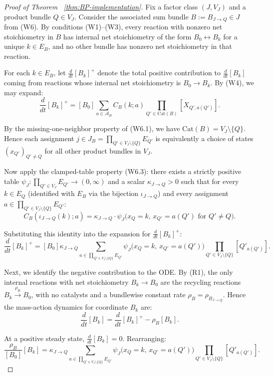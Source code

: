 \documentclass{article}
\theoremstyle{plain}
\theoremstyle{definition}
\theoremstyle{remark}
\newcommand{\Cat}{\textrm{Cat}}
\newcommand{\<}{\langle}
\renewcommand{\>}{\rangle}
\begin{document}
\begin{proof}[Proof of Theorem ~\ref{thm:BP-implementation}]
Fix a factor class $(J, V_J)$ and a product bundle $Q \in V_J$. Consider the 
associated sum bundle $B := B_{J \to Q} \in J$ from (W6). By conditions (W1)--(W3), 
every reaction with nonzero net stoichiometry in $B$ has internal net stoichiometry 
of the form $B_0 \leftrightarrow B_k$ for a unique $k \in E_B$, and no other bundle 
has nonzero net stoichiometry in that reaction.

For each $k \in E_B$, let $\frac{d}{dt}[B_k]^+$ denote the total positive contribution 
to $\frac{d}{dt}[B_k]$ coming from reactions whose internal net stoichiometry is 
$B_0 \to B_k$. By (W4), we may expand:
\[
\frac{d}{dt}[B_k]^+ = [B_0] \sum_{a \in \mathcal A_B} C_B(k; a) \prod_{Q' \in \Cat(B)} [X_{Q', a(Q')}].
\]

By the missing-one-neighbor property of (W6.1), we have $\Cat(B) = V_J \setminus \{Q\}$. 
Hence each assignment $j \in J_B = \prod_{Q' \in V_J \setminus \{Q\}} E_{Q'}$ is equivalently 
a choice of states $(x_{Q'})_{Q' \neq Q}$ for all other product bundles in $V_J$.

Now apply the clamped-table property (W6.3): there exists a strictly positive table 
$\psi_J : \prod_{Q' \in V_J} E_{Q'} \to (0, \infty)$ and a scalar $\kappa_{J \to Q} > 0$ 
such that for every $k \in E_Q$ (identified with $E_B$ via the bijection $\iota_{J \to Q}$) 
and every assignment $a \in \prod_{Q' \in V_J\setminus\{Q\}} E_{Q'}$:
\[
C_B(\iota_{J \to Q}(k); a) = \kappa_{J \to Q} \cdot \psi_J\bigl(x_Q = k,\, x_{Q'} = a(Q') \text{ for } Q' \neq Q\bigr).
\]

Substituting this identity into the expansion for $\frac{d}{dt}[B_k]^+$:
\[
\frac{d}{dt}[B_k]^+ = [B_0] \kappa_{J \to Q} \sum_{a \in \prod_{Q' \in V_J\setminus\{Q\}} E_{Q'}} 
\psi_J\bigl(x_Q = k,\, x_{Q'} = a(Q')\bigr) \prod_{Q' \in V_J\setminus\{Q\}} [Q'_{a(Q')}].
\]

Next, we identify the negative contribution to the ODE. By (R1), the only internal reactions 
with net stoichiometry $B_k \to B_0$ are the recycling reactions 
$B_k \xrightarrow{\rho_B} B_0$, with no catalysts and a bundlewise constant rate 
$\rho_B = \rho_{B_{J \to Q}}$. Hence the mass-action dynamics for coordinate $B_k$ are:
\[
\frac{d}{dt}[B_k] = \frac{d}{dt}[B_k]^+ - \rho_B [B_k].
\]

At a positive steady state, $\frac{d}{dt}[B_k] = 0$. Rearranging:
\begin{equation}\label{eq:sum-derived}
\frac{\rho_B}{[B_0]}[B_k] = \kappa_{J \to Q} \sum_{a \in \prod_{Q' \in V_J \setminus \{Q\}} E_{Q'}} 
\psi_J\bigl(x_Q = k,\, x_{Q'} = a(Q')\bigr) \prod_{Q' \in V_J\setminus\{Q\}} [Q'_{a(Q')}].
\end{equation}


\end{proof}
\end{document}
